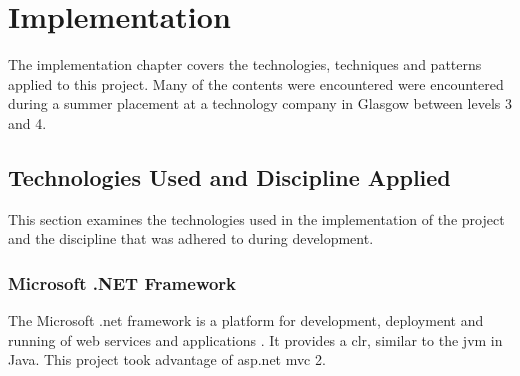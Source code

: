 \chapter{Implementation}
\label{impl}
The implementation chapter covers the technologies, techniques and patterns applied to this project.  Many of the contents were encountered were encountered during a summer placement at a technology company in Glasgow between levels 3 and 4.  

\section{Technologies Used and Discipline Applied}
This section examines the technologies used in the implementation of the project and the discipline that was adhered to during development.

\subsection{Microsoft .NET Framework}
The Microsoft .\gls{net} framework is a platform for development, deployment and running of web services and applications \cite{whatIsDotNet}.  It provides a \gls{clr}, similar to the \gls{jvm} in Java.  This project took advantage of \gls{asp}.\gls{net} \gls{mvc} 2.  

